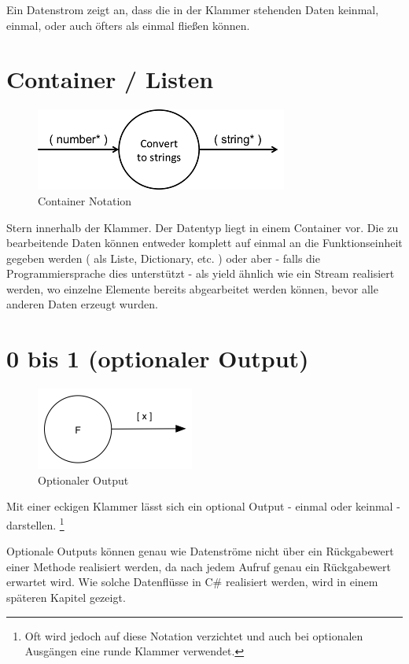 Ein Datenstrom zeigt an, dass die in der Klammer stehenden Daten keinmal,
einmal, oder auch öfters als einmal fließen können.

\section{Container / Listen}


\begin{figure}[H]
	\centering
	\includegraphics[width=.7\linewidth]{./img/diagramCollection.png}
	\caption{Container Notation}
\end{figure}


Stern innerhalb der Klammer.
Der Datentyp liegt in einem Container vor.
Die zu bearbeitende Daten können entweder komplett auf einmal an die Funktionseinheit gegeben werden ( als Liste, Dictionary, etc. )
oder aber - falls die Programmiersprache dies unterstützt - als yield ähnlich
wie ein Stream realisiert werden, wo einzelne Elemente bereits abgearbeitet werden
können, bevor alle anderen Daten erzeugt wurden.

\section{0 bis 1 (optionaler Output)}

\begin{figure}[H]
	\centering
	\includegraphics[width=.5\linewidth]{./img/diagramOptional.png}
	\caption{Optionaler Output}
\end{figure}


Mit einer eckigen Klammer lässt sich ein optional Output - einmal oder keinmal -
darstellen. \footnote{Oft wird jedoch auf diese Notation verzichtet und auch bei optionalen Ausgängen eine runde Klammer verwendet. 
}

Optionale Outputs können genau wie Datenströme nicht über ein Rückgabewert einer
Methode realisiert werden, da nach jedem Aufruf genau ein Rückgabewert erwartet wird. Wie solche
Datenflüsse in C\# realisiert werden, wird in einem späteren Kapitel gezeigt.

